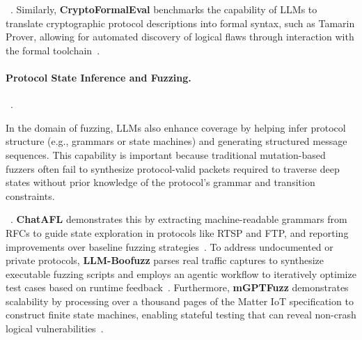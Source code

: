 ~.
Similarly, \textbf{CryptoFormalEval} benchmarks the capability of LLMs to translate cryptographic protocol descriptions into formal syntax, such as Tamarin Prover, allowing for automated discovery of logical flaws through interaction with the formal toolchain~\cite{curaba24}.

\paragraph{Protocol State Inference and Fuzzing.}
~.

In the domain of fuzzing, LLMs also enhance coverage by helping infer protocol structure (e.g., grammars or state machines) and generating structured message sequences. 
This capability is important because traditional mutation-based fuzzers often fail to synthesize protocol-valid packets required to traverse deep states without prior knowledge of the protocol's grammar and transition constraints. 

~.
\textbf{ChatAFL} demonstrates this by extracting machine-readable grammars from RFCs to guide state exploration in protocols like RTSP and FTP, and reporting improvements over baseline fuzzing strategies~\cite{meng24}. 
To address undocumented or private protocols, \textbf{LLM-Boofuzz} parses real traffic captures to synthesize executable fuzzing scripts and employs an agentic workflow to iteratively optimize test cases based on runtime feedback~\cite{wang25boofuzz}. 
Furthermore, \textbf{mGPTFuzz} demonstrates scalability by processing over a thousand pages of the Matter IoT specification to construct finite state machines, enabling stateful testing that can reveal non-crash logical vulnerabilities~\cite{ma24}.


